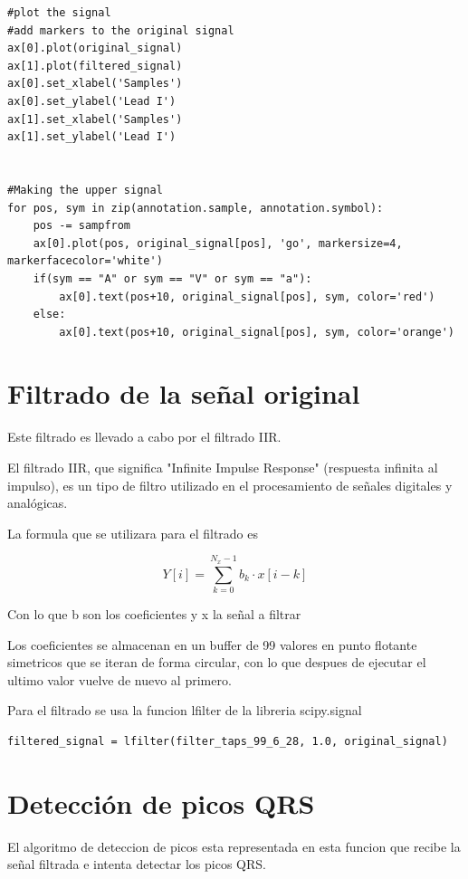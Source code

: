 \lstset{language=python, breaklines=true, basicstyle=\footnotesize}
\begin{lstlisting}[frame=single]
#plot the signal
#add markers to the original signal
ax[0].plot(original_signal)
ax[1].plot(filtered_signal)
ax[0].set_xlabel('Samples')
ax[0].set_ylabel('Lead I')
ax[1].set_xlabel('Samples')
ax[1].set_ylabel('Lead I')


#Making the upper signal
for pos, sym in zip(annotation.sample, annotation.symbol):
    pos -= sampfrom
    ax[0].plot(pos, original_signal[pos], 'go', markersize=4, markerfacecolor='white')
    if(sym == "A" or sym == "V" or sym == "a"):
        ax[0].text(pos+10, original_signal[pos], sym, color='red')
    else:
        ax[0].text(pos+10, original_signal[pos], sym, color='orange')
\end{lstlisting}

\section{Filtrado de la señal original}
Este filtrado es llevado a cabo por el filtrado IIR.

El filtrado IIR, que significa "Infinite Impulse Response" (respuesta infinita al impulso),
es un tipo de filtro utilizado en el procesamiento de señales digitales y analógicas.

La formula que se utilizara para el filtrado es

\[ Y[i] = \sum_{k=0}^{N_x -1} b_k \cdot x[i-k] \]

Con lo que b son los coeficientes y x la señal a filtrar

Los coeficientes se almacenan en un buffer de 99 valores en punto flotante simetricos que se iteran de forma 
circular, con lo que despues de ejecutar el ultimo valor vuelve de nuevo al primero.  

Para el filtrado se usa la funcion lfilter de la libreria scipy.signal

\lstset{language=python, breaklines=true, basicstyle=\footnotesize}
\begin{lstlisting}[frame=single]
    filtered_signal = lfilter(filter_taps_99_6_28, 1.0, original_signal)
\end{lstlisting}

\section{Detección de picos QRS}

El algoritmo de deteccion de picos esta representada en esta funcion que 
recibe la señal filtrada e intenta detectar los picos QRS.


